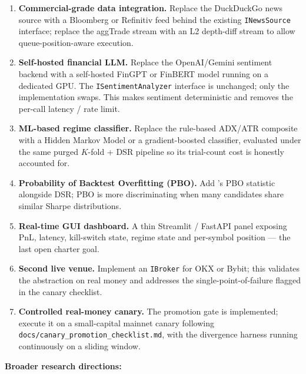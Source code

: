 \documentclass[a4paper, 12pt, titlepage]{article}
\begin{document}
\begin{enumerate}[label=F\arabic*.,leftmargin=2.4em]
    \item \textbf{Commercial-grade data integration.} Replace the
    DuckDuckGo news source with a Bloomberg or Refinitiv feed
    behind the existing \texttt{INewsSource} interface; replace the
    aggTrade stream with an L2 depth-diff stream to allow
    queue-position-aware execution.
    \item \textbf{Self-hosted financial LLM.} Replace the
    OpenAI/Gemini sentiment backend with a self-hosted FinGPT
    \cite{yang2023fingpt} or FinBERT model running on a dedicated
    GPU. The \texttt{ISentimentAnalyzer} interface is unchanged;
    only the implementation swaps. This makes sentiment
    deterministic and removes the per-call latency / rate limit.
    \item \textbf{ML-based regime classifier.} Replace the
    rule-based ADX/ATR composite with a Hidden Markov Model or a
    gradient-boosted classifier, evaluated under the same purged
    $K$-fold + DSR pipeline so its trial-count cost is honestly
    accounted for.
    \item \textbf{Probability of Backtest Overfitting (PBO).} Add
    \cite{bailey2017probability}'s PBO statistic alongside DSR; PBO
    is more discriminating when many candidates share similar
    Sharpe distributions.
    \item \textbf{Real-time GUI dashboard.} A thin Streamlit /
    FastAPI panel exposing PnL, latency, kill-switch state, regime
    state and per-symbol position --- the last open charter goal.
    \item \textbf{Second live venue.} Implement an \texttt{IBroker}
    for OKX or Bybit; this validates the abstraction on real money
    and addresses the single-point-of-failure flagged in the canary
    checklist.
    \item \textbf{Controlled real-money canary.} The promotion gate
    is implemented; execute it on a small-capital mainnet canary
    following \texttt{docs/canary\_promotion\_checklist.md}, with
    the divergence harness running continuously on a sliding
    window.
\end{enumerate}

\textbf{Broader research directions:}
\end{document}
